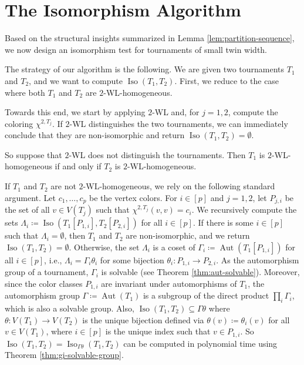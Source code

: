 \PassOptionsToPackage{dvipsnames,svgnames}{xcolor}\documentclass[10pt,a4paper]{article}
\newcommand{\WL}[2]{\chi^{#1,#2}}
\DeclareMathOperator{\Aut}{Aut}
\DeclareMathOperator{\Iso}{Iso}
\begin{document}
\section{The Isomorphism Algorithm}
\label{sec:alg}

Based on the structural insights summarized in Lemma \ref{lem:partition-sequence}, we now design an isomorphism test for tournaments of small twin width.

The strategy of our algorithm is the following.
We are given two tournaments $T_1$ and $T_2$, and we want to compute $\Iso(T_1,T_2)$.
First, we reduce to the case where both $T_1$ and $T_2$ are $2$-WL-homogeneous.

Towards this end, we start by applying $2$-WL and, for $j=1,2$, compute the coloring $\WL{2}{T_j}$.
If $2$-WL distinguishes the two tournaments, we can immediately conclude that they are non-isomorphic and return $\Iso(T_1,T_2) = \emptyset$.

So suppose that $2$-WL does not distinguish the tournaments.
Then $T_1$ is $2$-WL-homogeneous if and only if $T_2$ is $2$-WL-homogeneous.

If $T_1$ and $T_2$ are not $2$-WL-homogeneous, we rely on the following standard argument.
Let $c_1,\ldots,c_p$ be the vertex colors.
For $i \in [p]$ and $j=1,2$, let $P_{j,i}$ be the set of all $v\in V(T_j)$ such that $\WL{2}{T_j}(v,v) = c_i$.
We recursively compute the sets $\Lambda_i \coloneqq \Iso(T_1[P_{1,i}],T_2[P_{2,i}])$ for all $i \in [p]$.
If there is some $i \in [p]$ such that $\Lambda_i = \emptyset$, then $T_1$ and $T_2$ are non-isomorphic, and we return $\Iso(T_1,T_2)=\emptyset$.
Otherwise, the set $\Lambda_i$ is a coset of $\Gamma_i \coloneqq \Aut(T_1[P_{1,i}])$ for all $i \in [p]$, i.e., $\Lambda_i = \Gamma_i\theta_i$ for some bijection $\theta_i\colon P_{1,i} \to P_{2,i}$.
As the automorphism group of a tournament, $\Gamma_i$ is solvable (see Theorem \ref{thm:aut-solvable}).
Moreover, since the color classes $P_{1,i}$ are invariant under automorphisms of $T_1$, the automorphism group $\Gamma \coloneqq \Aut(T_1)$ is a subgroup of the direct product $\prod_i \Gamma_{i}$, which is also a solvable group.
Also, $\Iso(T_1,T_2) \subseteq \Gamma\theta$ where $\theta\colon V(T_1) \to V(T_2)$ is the unique bijection defined via $\theta(v) \coloneqq \theta_i(v)$ for all $v \in V(T_1)$, where $i \in [p]$ is the unique index such that $v \in P_{1,i}$.
So $\Iso(T_1,T_2) = \Iso_{\Gamma\theta}(T_1,T_2)$ can be computed in polynomial time using Theorem \ref{thm:gi-solvable-group}.
\end{document}
